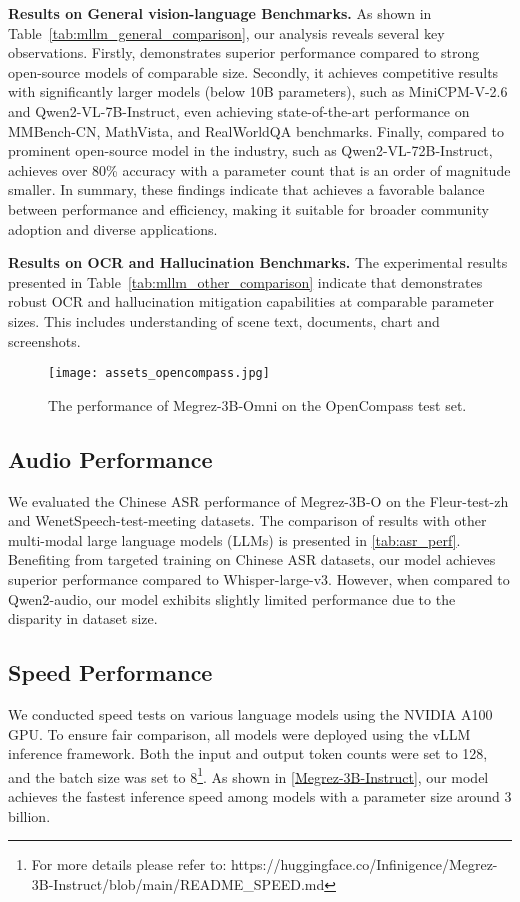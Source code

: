 \textbf{Results on General vision-language Benchmarks.} \quad 
As shown in Table~\ref{tab:mllm_general_comparison}, our analysis reveals several key observations. Firstly, \ouromni demonstrates superior performance compared to strong open-source models of comparable size. Secondly, it achieves competitive results with significantly larger models (below 10B parameters), such as MiniCPM-V-2.6 and Qwen2-VL-7B-Instruct, even achieving state-of-the-art performance on MMBench-CN, MathVista, and RealWorldQA benchmarks. Finally, compared to prominent open-source model in the industry, such as Qwen2-VL-72B-Instruct, \ouromni achieves over 80\% accuracy with a parameter count that is an order of magnitude smaller. In summary, these findings indicate that \ouromni achieves a favorable balance between performance and efficiency, making it suitable for broader community adoption and diverse applications.

 

\textbf{Results on OCR and Hallucination Benchmarks.} \quad 
The experimental results presented in Table~\ref{tab:mllm_other_comparison} indicate that \ouromni demonstrates robust OCR and hallucination mitigation capabilities at comparable parameter sizes. This includes understanding of scene text, documents, chart and screenshots.


\begin{figure}[htbp]
  \centering
  \texttt{[image: assets\_opencompass.jpg]}
  \caption{The performance of Megrez-3B-Omni on the OpenCompass test set.}
  \label{fig:assets_opencompass}
\end{figure}



\subsection{Audio Performance}



We evaluated the Chinese ASR performance of Megrez-3B-O on the Fleur-test-zh and WenetSpeech-test-meeting datasets. The comparison of results with other multi-modal large language models (LLMs) is presented in \autoref{tab:asr_perf}. Benefiting from targeted training on Chinese ASR datasets, our model achieves superior performance compared to Whisper-large-v3. However, when compared to Qwen2-audio, our model exhibits slightly limited performance due to the disparity in dataset size.


\subsection{Speed Performance}

We conducted speed tests on various language models using the NVIDIA A100 GPU. To ensure fair comparison, all models were deployed using the vLLM inference framework. Both the input and output token counts were set to 128, and the batch size was set to 8\footnote{For more details please refer to:  https://huggingface.co/Infinigence/Megrez-3B-Instruct/blob/main/README\_SPEED.md}. As shown in \autoref{Megrez-3B-Instruct}, our model achieves the fastest inference speed among models with a parameter size around 3 billion. 
